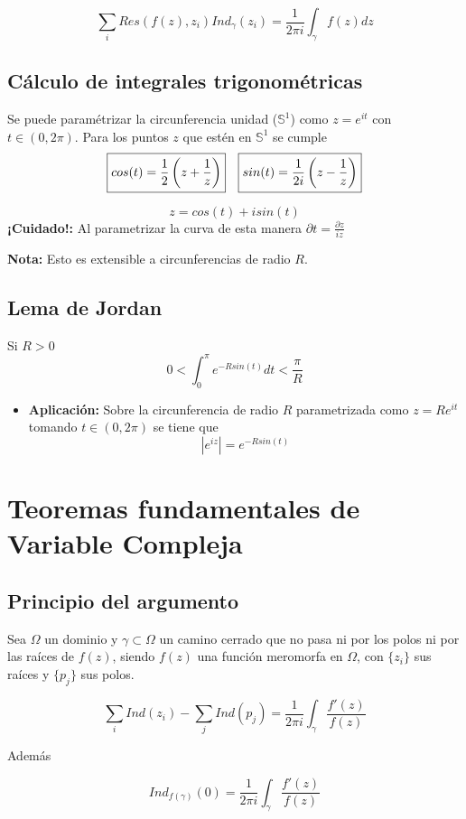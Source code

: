 \documentclass[paper=a4, fontsize=11pt]{scrartcl}
\numberwithin{equation}{section}
\numberwithin{figure}{section}
\numberwithin{table}{section}
\begin{document}
$$\boxed{\sum_i Res\left(f(z), z_i\right)Ind_\gamma(z_i) = \frac{1}{2\pi i}\int_\gamma f(z)dz}$$


\subsection{Cálculo de integrales trigonométricas}
Se puede paramétrizar la circunferencia unidad ($\mathbb{S}^1$) como $z=e^{it}$ con $t\in (0,2\pi)$.
Para los puntos $z$ que estén en $\mathbb{S}^1$ se cumple
$$
\begin{array}{l r}
\boxed{cos(t) = \frac{1}{2}\left(z+\frac{1}{z}\right)} & \boxed{sin(t) = \frac{1}{2i}\left(z-\frac{1}{z}\right)}
\end{array}
$$

$$\boxed{z = cos(t)+isin(t)}$$
\textbf{¡Cuidado!:} Al parametrizar la curva de esta manera $\partial t = \frac{\partial z}{iz}$

\textbf{Nota: } Esto es extensible a circunferencias de radio $R$.
\subsection{Lema de Jordan}
Si $R>0$
$$\boxed{0<\int_0^\pi e^{-Rsin(t)}dt < \frac{\pi}{R}}$$

\begin{itemize}
\item \textbf{Aplicación:} Sobre la circunferencia de radio $R$ parametrizada como $z=Re^{it}$ tomando $t\in (0,2\pi)$ se tiene que
$$\boxed{\left|e^{iz}\right|=e^{-Rsin(t)}}$$
\end{itemize}

\newpage
\section{Teoremas fundamentales de Variable Compleja}

\subsection{Principio del argumento}
Sea $\Omega$ un dominio y $\gamma\subset\Omega$ un camino cerrado que no pasa ni por los polos ni por las raíces de $f(z)$, siendo $f(z)$ una función meromorfa en $\Omega$, con $\{z_i\}$ sus raíces y $\{p_j\}$ sus polos.

$$\sum_i Ind(z_i) - \sum_j Ind(p_j)= \frac{1}{2\pi i}\int_\gamma \frac{f'(z)}{f(z)}$$

Además

$$Ind_{f(\gamma)}(0) = \frac{1}{2\pi i}\int_\gamma \frac{f'(z)}{f(z)}$$
\end{document}
